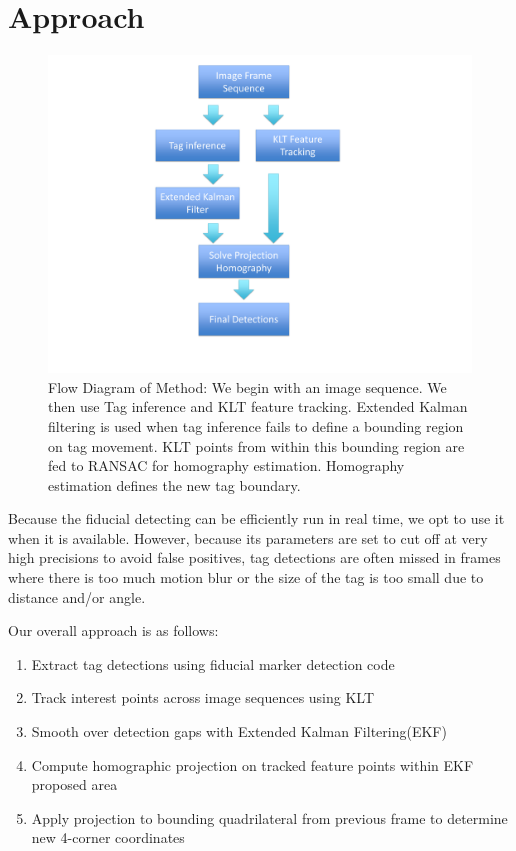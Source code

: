 \documentclass[12pt]{article}
\begin{document}
\section{Approach}
\label{sec:approach}
\begin{figure}
\centering
\includegraphics[scale=.15]{flowchart.pdf}
\caption{Flow Diagram of Method: We begin with an image sequence. We then use Tag inference and KLT feature tracking. Extended Kalman filtering is used when tag inference fails to define a bounding region on tag movement. KLT points from within this bounding region are fed to RANSAC for homography estimation. Homography estimation defines the new tag boundary.}
\end{figure}

Because the fiducial detecting can be efficiently run in real time, we opt to use it when it is available. However, because its parameters are set to cut off at very high precisions to avoid false positives, tag detections are often missed in frames where there is too much motion blur or the size of the tag is too small due to distance and/or angle.

Our overall approach is as follows:
\begin{enumerate}
\item Extract tag detections using fiducial marker detection code
\item Track interest points across image sequences using KLT
\item Smooth over detection gaps with Extended Kalman Filtering(EKF)
\item Compute homographic projection on tracked feature points within EKF proposed area
\item Apply projection to bounding quadrilateral from previous frame to determine new 4-corner coordinates
\end{enumerate}
\end{document}
